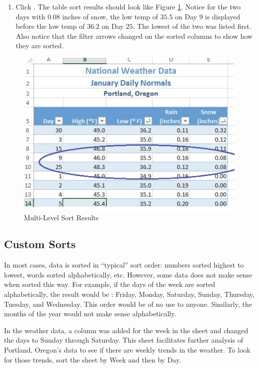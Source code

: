 \begin{enumerate}[resume]
	\item Click . The table sort results should look like Figure \ref{05:fig12}. Notice for the two days with $ 0.08 $ inches of snow, the low temp of $ 35.5 $ on Day $ 9 $ is displayed before the low temp of $ 36.2 $ on Day $ 25 $. The lowest of the two was listed first. Also notice that the filter arrows changed on the sorted columns to show how they are sorted.
\end{enumerate}

\begin{figure}[H]
	\centering
	\includegraphics[width=\maxwidth{.95\linewidth}]{gfx/ch05_fig12}
	\caption{Multi-Level Sort Results}
	\label{05:fig12}
\end{figure}

\subsection{Custom Sorts}

In most cases, data is sorted in ``typical'' sort order: numbers sorted highest to lowest, words sorted alphabetically, etc. However, some data does not make sense when sorted this way. For example, if the days of the week are sorted alphabetically, the result would be : Friday, Monday, Saturday, Sunday, Thursday, Tuesday, and Wednesday. This order would be of no use to anyone. Similarly, the months of the year would not make sense alphabetically.

In the weather data, a column was added for the week in the  sheet and changed the days to Sunday through Saturday. This sheet facilitates further analysis of Portland, Oregon's data to see if there are weekly trends in the weather. To look for those trends, sort the  sheet by Week and then by Day.

